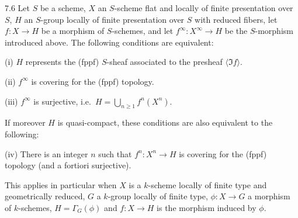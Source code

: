 \begin{proposition}{7.6}\label{VIB.7.6}
Let $S$ be a scheme, $X$ an $S$-scheme flat and locally of finite presentation over $S$, $H$ an $S$-group locally of finite presentation over $S$ with reduced fibers, let $f:X\to H$ be a morphism of $S$-schemes, and let $f^\infty:X^\infty\to H$ be the $S$-morphism introduced above. The following conditions are equivalent:

(i) $H$ represents the (fppf) $S$-sheaf associated to the presheaf $\langle\Im f\rangle$.

(ii) $f^\infty$ is covering for the (fppf) topology.

(iii) $f^\infty$ is surjective, i.e.\ $H=\bigcup_{n\geq1}f^n(X^n)$.

If moreover $H$ is quasi-compact, these conditions are also equivalent to the following:

(iv) There is an integer $n$ such that $f^n:X^n\to H$ is covering for the (fppf) topology (and a fortiori surjective).

This applies in particular when $X$ is a $k$-scheme locally of finite type and geometrically reduced, $G$ a $k$-group locally of finite type, $\phi:X\to G$ a morphism of $k$-schemes, $H=\Gamma_G(\phi)$ and $f:X\to H$ is the morphism induced by $\phi$.
\end{proposition}
